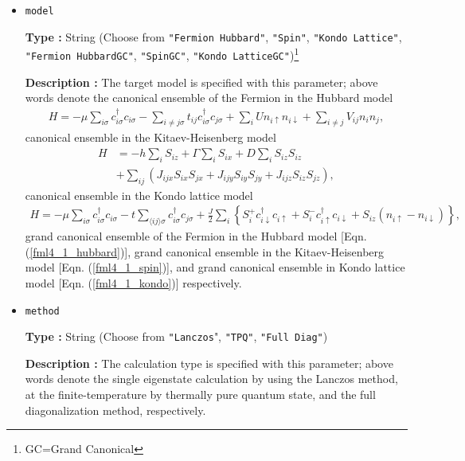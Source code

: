 \begin{itemize}

\item \verb|model|

{\bf Type :} String (Choose from \verb|"Fermion Hubbard"|, \verb|"Spin"|, \verb|"Kondo Lattice"|, 
\verb|"Fermion HubbardGC"|, \verb|"SpinGC"|, \verb|"Kondo LatticeGC"|)\footnote{GC=Grand Canonical}

{\bf Description :} The target model is specified with this parameter;
above words denote the canonical ensemble of the Fermion in the Hubbard model
\begin{align}
H = -\mu \sum_{i \sigma} c^\dagger_{i \sigma} c_{i \sigma} 
- \sum_{i \neq j \sigma} t_{i j} c^\dagger_{i \sigma} c_{j \sigma} 
+ \sum_{i} U n_{i \uparrow} n_{i \downarrow}
+ \sum_{i \neq j} V_{i j} n_{i} n_{j},
\label{fml4_1_hubbard}
\end{align}
canonical ensemble in the Kitaev-Heisenberg model
\begin{align}
H &= -h \sum_{i} S_{i z} + \Gamma \sum_{i} S_{i x} + D \sum_{i} S_{i z} S_{i z}
\nonumber \\
&+ \sum_{i j} \left( J_{i j x} S_{i x} S_{j x} + J_{i j y} S_{i y} S_{j y} + J_{i j z} S_{i z} S_{j z} 
\right),
\label{fml4_1_spin}
\end{align}
canonical ensemble in the Kondo lattice model
\begin{align}
H = - \mu \sum_{i \sigma} c^\dagger_{i \sigma} c_{i \sigma} 
- t \sum_{\langle i j \rangle \sigma} c^\dagger_{i \sigma} c_{j \sigma} 
+ \frac{J}{2} \sum_{i} \left\{
S_{i}^{+} c_{i \downarrow}^\dagger c_{i \uparrow}
+ S_{i}^{-} c_{i \uparrow}^\dagger c_{i \downarrow}
+ S_{i z} (n_{i \uparrow} - n_{i \downarrow})
\right\},
\label{fml4_1_kondo}
\end{align}
grand canonical ensemble of the Fermion in the Hubbard model [Eqn. (\ref{fml4_1_hubbard})],
grand canonical ensemble in the Kitaev-Heisenberg model [Eqn. (\ref{fml4_1_spin})],
and
grand canonical ensemble in Kondo lattice model [Eqn. (\ref{fml4_1_kondo})]
respectively.

\item \verb|method|
  
{\bf Type :} String (Choose from \verb|"Lanczos|", \verb|"TPQ"|, \verb|"Full Diag"|)

{\bf Description :} The calculation type is specified with this parameter;
above words denote 
the single eigenstate calculation by using the Lanczos method,
at the finite-temperature by thermally pure quantum state,
and the full diagonalization method,
respectively.


\end{itemize}

